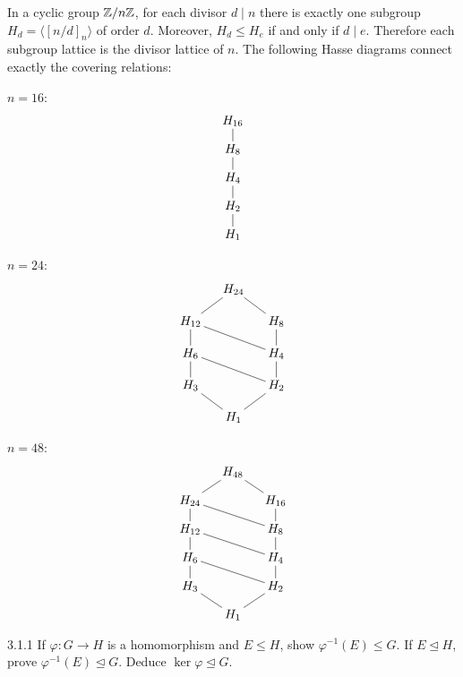\documentclass[11pt,oneside]{article}
\begin{document}
\begin{solution}
In a cyclic group $\mathbb{Z}/n\mathbb{Z}$, for each divisor $d\mid n$ there is exactly one subgroup $H_d=\langle[n/d]_n\rangle$ of order $d$. Moreover, $H_d\le H_e$ if and only if $d\mid e$. Therefore each subgroup lattice is the divisor lattice of $n$. The following Hasse diagrams connect exactly the covering relations:
\begin{exercisesubparts}
\item $n=16$:
\[
\begin{tikzpicture}[baseline=(current bounding box.center),every node/.style={inner sep=2pt}]
\node (a) at (0,0) {$H_{16}$};\node (b) at (0,-.8) {$H_8$};\node (c) at (0,-1.6) {$H_4$};\node (d) at (0,-2.4) {$H_2$};\node (e) at (0,-3.2) {$H_1$};\draw(a)--(b)--(c)--(d)--(e);
\end{tikzpicture}
\]
\item $n=24$:
\[
\begin{tikzpicture}[baseline=(current bounding box.center),every node/.style={inner sep=2pt}]
\node (a) at (0,0) {$H_{24}$};\node (b) at (-1.2,-.9) {$H_{12}$};\node (c) at (1.2,-.9) {$H_8$};\node (d) at (-1.2,-1.8) {$H_6$};\node (e) at (1.2,-1.8) {$H_4$};\node (f) at (-1.2,-2.7) {$H_3$};\node (g) at (1.2,-2.7) {$H_2$};\node (h) at (0,-3.6) {$H_1$};
\draw(a)--(b) (a)--(c) (b)--(d) (b)--(e) (c)--(e) (d)--(f) (d)--(g) (e)--(g) (f)--(h) (g)--(h);
\end{tikzpicture}
\]
\item $n=48$:
\[
\begin{tikzpicture}[baseline=(current bounding box.center),every node/.style={inner sep=2pt}]
\node (a) at (0,0) {$H_{48}$};\node (b) at (-1.2,-.8) {$H_{24}$};\node (c) at (1.2,-.8) {$H_{16}$};\node (d) at (-1.2,-1.6) {$H_{12}$};\node (e) at (1.2,-1.6) {$H_8$};\node (f) at (-1.2,-2.4) {$H_6$};\node (g) at (1.2,-2.4) {$H_4$};\node (h) at (-1.2,-3.2) {$H_3$};\node (i) at (1.2,-3.2) {$H_2$};\node (j) at (0,-4) {$H_1$};
\draw(a)--(b) (a)--(c) (b)--(d) (b)--(e) (c)--(e) (d)--(f) (d)--(g) (e)--(g) (f)--(h) (f)--(i) (g)--(i) (h)--(j) (i)--(j);
\end{tikzpicture}
\]
\end{exercisesubparts}
\end{solution}

\begin{exercise}{3.1.1}
If $\varphi:G\to H$ is a homomorphism and $E\le H$, show $\varphi^{-1}(E)\le G$. If $E\trianglelefteq H$, prove $\varphi^{-1}(E)\trianglelefteq G$. Deduce $\ker\varphi\trianglelefteq G$.
\end{exercise}
\end{document}
